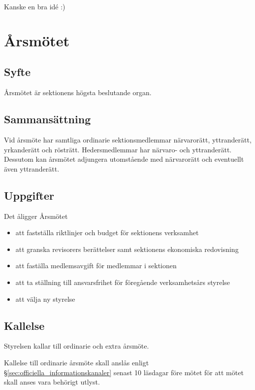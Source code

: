 \documentclass{dgovdoc}
\begin{document}
Kanske en bra idé :)

\section{Årsmötet}

\subsection{Syfte}

Årsmötet är sektionens högsta beslutande organ.

\subsection{Sammansättning}

Vid årsmöte har samtliga ordinarie sektionsmedlemmar närvarorätt, yttranderätt,
yrkanderätt och rösträtt. Hedersmedlemmar har närvaro- och yttranderätt. Dessutom kan årsmötet
adjungera utomstående med närvarorätt och eventuellt även yttranderätt.

\subsection{Uppgifter}

Det åligger Årsmötet

\begin{itemize}
  \item att fastställa riktlinjer och budget för sektionens verksamhet
  \item att granska revisorers berättelser samt sektionens
    ekonomiska redovisning
  \item att faställa medlemsavgift för medlemmar i sektionen
  \item att ta ställning till ansvarsfrihet för föregående verksamhetsårs styrelse
  \item att välja ny styrelse

\end{itemize}

\subsection{Kallelse}
\label{sec:kallelse}

Styrelsen kallar till ordinarie och extra årsmöte.

Kallelse till ordinarie årsmöte skall anslås enligt
\S\ref{sec:officiella_informationskanaler} senast 10 läsdagar före mötet för att mötet skall anses vara
behörigt utlyst.
\end{document}
